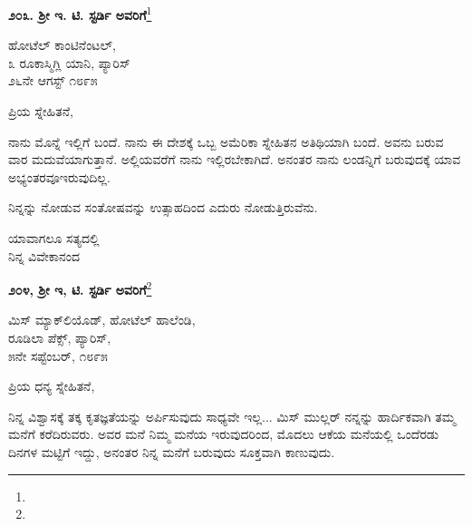 \begin{center}
\textbf{೨೦೩. ಶ‍್ರೀ ಇ. ಟಿ. ಸ್ಟರ್ಡಿ ಅವರಿಗೆ}\footnote{}
\end{center}

\vspace{-0.6cm}

\begin{flushright}
ಹೋಟೆಲ್ ಕಾಂಟಿನೆಂಟಲ್,\\೩ ರೂಕಾಸ್ಮಿಗ್ಲಿ ಯಾನಿ, ಪ್ಯಾರಿಸ್\\೨೬ನೇ ಆಗಸ್ಟ್ ೧೮೯೫
\end{flushright}

\vspace{-0.3cm}

\noindent
ಪ್ರಿಯ ಸ್ನೇಹಿತನೆ,

ನಾನು ಮೊನ್ನೆ ಇಲ್ಲಿಗೆ ಬಂದೆ. ನಾನು ಈ ದೇಶಕ್ಕೆ ಒಬ್ಬ ಅಮೆರಿಕಾ ಸ್ನೇಹಿತನ ಅತಿಥಿಯಾಗಿ ಬಂದೆ. ಅವನು ಬರುವ ವಾರ ಮದುವೆಯಾಗುತ್ತಾನೆ. ಅಲ್ಲಿಯವರೆಗೆ ನಾನು ಇಲ್ಲಿರಬೇಕಾಗಿದೆ. ಅನಂತರ ನಾನು ಲಂಡನ್ನಿಗೆ ಬರುವುದಕ್ಕೆ ಯಾವ ಅಭ್ಯಂತರವೂ\break ಇರುವುದಿಲ್ಲ.

ನಿನ್ನನ್ನು ನೋಡುವ ಸಂತೋಷವನ್ನು ಉತ್ಸಾಹದಿಂದ ಎದುರು ನೋಡುತ್ತಿರುವೆನು.

\vspace{-0.4cm}

{\flushright
ಯಾವಾಗಲೂ ಸತ್ಯದಲ್ಲಿ\\ನಿನ್ನ ವಿವೇಕಾನಂದ\par}

\vspace{-0.3cm}

\begin{center}
\textbf{೨೦೪, ಶ‍್ರೀ ಇ, ಟಿ. ಸ್ಟರ್ಡಿ ಅವರಿಗೆ}\footnote{}
\end{center}

\vspace{-0.5cm}

\begin{flushright}
 ಮಿಸ್ ಮ್ಯಾಕ್‌ಲಿಯೊಡ್, ಹೋಟೆಲ್ ಹಾಲೆಂಡಿ,\\ರೂಡಿಲಾ ಪೆಕ್ಸ್, ಪ್ಯಾರಿಸ್,\\೫ನೇ ಸಪ್ಟೆಂಬರ್, ೧೮೯೫
\end{flushright}

\vspace{-0.3cm}

\noindent
ಪ್ರಿಯ ಧನ್ಯ ಸ್ನೇಹಿತನೆ,

ನಿನ್ನ ವಿಶ್ವಾಸಕ್ಕೆ ತಕ್ಕ ಕೃತಜ್ಞತೆಯನ್ನು ಅರ್ಪಿಸುವುದು ಸಾಧ್ಯವೇ ಇಲ್ಲ... ಮಿಸ್ ಮುಲ್ಲರ್ ನನ್ನನ್ನು ಹಾರ್ದಿಕವಾಗಿ ತಮ್ಮ ಮನೆಗೆ ಕರೆದಿರುವರು. ಅವರ ಮನೆ ನಿಮ್ಮ ಮನೆಯ ಇರುವುದರಿಂದ, ಮೊದಲು ಆಕೆಯ ಮನೆಯಲ್ಲಿ ಒಂದೆರಡು ದಿನಗಳ ಮಟ್ಟಿಗೆ ಇದ್ದು, ಅನಂತರ ನಿನ್ನ ಮನೆಗೆ ಬರುವುದು ಸೂಕ್ತವಾಗಿ ಕಾಣುವುದು.

